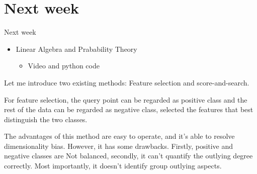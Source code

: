 \documentclass[
 size=14pt,
 paper=smartboard,  %
 mode=present, 		%
 display=slides, 	%
 style=tuliplab,  	%
 pauseslide,
 fleqn,leqno]{powerdot}
\begin{document}


\section{Next week}


\begin{slide}{Next week}
\begin{itemize}
\item
Linear Algebra and Prabability Theory

\begin{itemize}
\item
Video and python code
\end{itemize}



\end{itemize}

\begin{note}
Let me introduce two existing methods:
Feature selection and score-and-search.

For feature selection,
the query point can be regarded as positive class and
the rest of the data can be regarded as negative class,
selected the features that best distinguish the two classes.

The advantages of this method are easy to operate,
and it's able to resolve dimensionality bias.
However, it has some drawbacks.
Firstly,
positive and negative classes are Not balanced,
secondly,
it can't quantify the outlying degree correctly.
Most importantly,
it doesn't identify group outlying aspects.
\end{note}

\end{slide}
\end{document}
